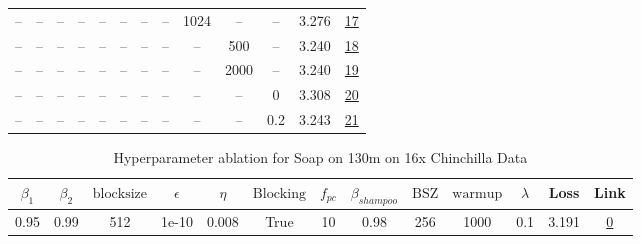 \begin{table}[H]
\begin{tabular}{ccccccccccccc}
-- & -- & -- & -- & -- & -- & -- & -- & 1024 & -- & -- & 3.276 & \href{https://wandb.ai/stanford-mercury/optimizer-scaling/runs/sweep-130m-21B-soape55a246lr0.008-wd0.1-minlr0-warmup1000-b10.95-73d7b2}{17} \\
-- & -- & -- & -- & -- & -- & -- & -- & -- & 500 & -- & 3.240 & \href{https://wandb.ai/stanford-mercury/optimizer-scaling/runs/sweep-130m-21B-soape5e3c26lr0.008-wd0.1-minlr0-warmup500-b10.95--603435}{18} \\
-- & -- & -- & -- & -- & -- & -- & -- & -- & 2000 & -- & 3.240 & \href{https://wandb.ai/stanford-mercury/optimizer-scaling/runs/sweep-130m-21B-soapeaabbfclr0.008-wd0.1-minlr0-warmup2000-b10.95-1ffb1d}{19} \\
-- & -- & -- & -- & -- & -- & -- & -- & -- & -- & 0 & 3.308 & \href{https://wandb.ai/stanford-mercury/optimizer-scaling/runs/sweep-130m-21B-soape91df9clr0.008-wd0-minlr0-warmup1000-b10.95-b-345995}{20} \\
-- & -- & -- & -- & -- & -- & -- & -- & -- & -- & 0.2 & 3.243 & \href{https://wandb.ai/stanford-mercury/optimizer-scaling/runs/sweep-130m-21B-soapeb32093lr0.008-wd0.2-minlr0-warmup1000-b10.95-155463}{21} \\
\bottomrule
\end{tabular}
\end{table}

\begin{table}[H]
\centering
\caption{Hyperparameter ablation for Soap on 130m on 16x Chinchilla Data}
\label{tab:ablation_soap_130m_16}
\begin{tabular}{ccccccccccccc}
\toprule
$\beta_1$ & $\beta_2$ & $\mathrm{block size}$ & $\epsilon$ & $\eta$ & $\mathrm{Blocking}$ & $f_{pc}$ & $\beta_{shampoo}$ & $\mathrm{BSZ}$ & $\mathrm{warmup}$ & $\lambda$ & Loss & Link \\
\midrule
0.95 & 0.99 & 512 & 1e-10 & 0.008 & True & 10 & 0.98 & 256 & 1000 & 0.1 & 3.191 & \href{https://wandb.ai/stanford-mercury/optimizer-scaling/runs/sweep-130m-42B-soape1786aelr0.008-wd0.1-minlr0-warmup1000-b10.95-c390d2}{0} \\
\midrule
\bottomrule
\end{tabular}
\end{table}

